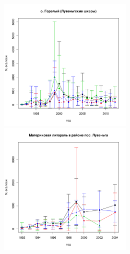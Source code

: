 \documentclass[12pt, a4paper]{article}
\begin{document}
\newpage
\begin{figure}[h]

\begin{minipage}[b]{.46\linewidth}
\begin{center}
\includegraphics[width=65mm]{../White_Sea/Luvenga_Goreliy/N2_dynamic.pdf}
\end{center}
\end{minipage}
%
\hfil %
%
\begin{minipage}[b]{.46\linewidth}
\begin{center}
\includegraphics[width=65mm]{../White_Sea//Luvenga_II_razrez/N2_dynamic.pdf}
\end{center}
\end{minipage}




\end{figure}
\end{document}

